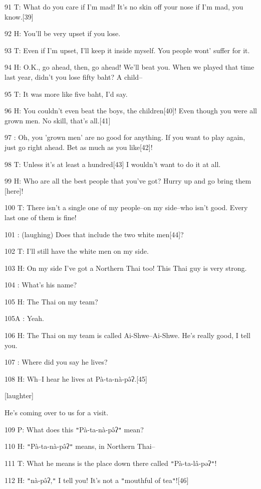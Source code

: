 91 T: What do you care if I'm mad! It's no skin off your nose if I'm mad, you know.[39]

92 H: You'll be very upset if you lose.

93 T: Even if I'm upset, I'll keep it inside myself. You people wont' suffer for
it.

94 H: O.K., go ahead, then, go ahead! We'll beat you. When we played that time
last year, didn't you lose fifty baht? A child--

95 T: It was more like five baht, I'd say.

96 H: You couldn't even beat the boys, the children[40]! Even though you were all
grown men. No skill, that's all.[41]

97    : Oh, you 'grown men' are no good for anything. If you want to play again,
just go right ahead. Bet as much as you like[42]!

98 T: Unless it's at least a hundred[43] I wouldn't want to do it at all.

99 H: Who are all the best people that you've got? Hurry up and go bring them [here]!

100 T: There isn't a single one of my people--on my side--who isn't good. Every
last one of them is fine!

101    : (laughing) Does that include the two white men[44]?

102 T: I'll still have the white men on my side.

103 H: On my side I've got a Northern Thai too! This Thai guy is very strong.

104    : What's his name?

105 H: The Thai on my team?

105A  : Yeah.

106 H: The Thai on my team is called Ai-Shwe--Ai-Shwe. He's really good, I tell
you.

107    : Where did you say he lives?

108 H: Wh--I hear he lives at Pà-ta-nà-pə̂ʔ.[45]

[laughter]

He's coming over to us for a visit.

109 P: What does this \texttt{"}Pà-ta-nà-pə̂ʔ\texttt{"} mean?

110 H: \texttt{"}Pà-ta-nà-pə̂ʔ\texttt{"} means, in Northern Thai--

111 T: What he means is the place down there called \texttt{"}Pà-ta-lâ-pəʔ\texttt{"}!

112 H: \texttt{"}nà-pə̂ʔ,\texttt{"} I tell you! It's not a \texttt{"}mouthful
of tea\texttt{"}![46]


